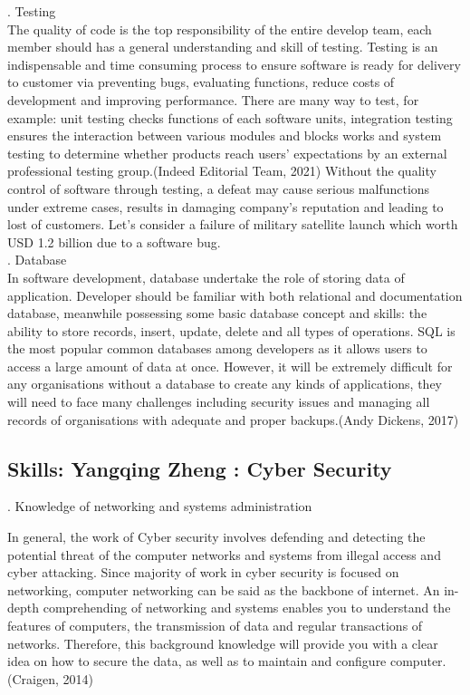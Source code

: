 \documentclass[a4paper, 11pt]{report}
\begin{document}
. Testing \\
\noindent The quality of code is the top responsibility of the entire develop team, each member should has a general understanding and skill of testing. Testing is an indispensable and time consuming process to ensure software is ready for delivery to customer via preventing bugs, evaluating functions, reduce costs of development and improving performance. There are many way to test, for example: unit testing checks functions of each software units, integration testing ensures the interaction between various modules and blocks works and system testing to determine whether products reach users' expectations by an external professional testing group.(Indeed Editorial Team, 2021) Without the quality control of software through testing, a defeat may cause serious malfunctions under extreme cases, results in damaging company's reputation and leading to lost of customers. Let's consider a failure of military satellite launch which worth USD 1.2 billion due to a software bug.\\

. Database\\
\noindent In software development, database undertake the role of storing data of application. Developer should be familiar with both relational and documentation database, meanwhile possessing some basic database concept and skills: the ability to store records, insert, update, delete and all types of operations. SQL is the most popular common databases among developers as it allows users to access a large amount of data at once. However, it will be extremely difficult for any organisations without a database to create any kinds of applications, they will need to face many challenges including security issues and managing all records of organisations with adequate and proper backups.(Andy Dickens, 2017)\\


\subsection{Skills: Yangqing Zheng : Cyber Security}

. Knowledge of networking and systems administration

\noindent In general, the work of Cyber security involves defending and detecting the potential threat of the computer networks and systems from illegal access and cyber attacking. Since majority of work in cyber security is focused on networking, computer networking can be said as the backbone of internet. An in-depth comprehending of networking and systems enables you to understand the features of computers, the transmission of data and regular transactions of networks. Therefore, this background knowledge will provide you with a clear idea on how to secure the data, as well as to maintain and configure computer. (Craigen,  2014)\\
\end{document}
